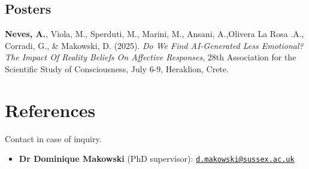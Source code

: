 \documentclass[11pt,a4paper,]{awesome-cv}
\providecommand{\tightlist}{%
	\setlength{\itemsep}{0pt}\setlength{\parskip}{0pt}}
\begin{document}
\normalsize

\subsection{Posters}\label{posters}

\small

\textbf{Neves, A.}, Viola, M., Sperduti, M., Marini, M., Ansani,
A.,Olivera La Rosa .A., Corradi, G., \& Makowski, D. (2025). \emph{Do We
Find AI-Generated Less Emotional? The Impact Of Reality Beliefs On
Affective Responses}, 28th Association for the Scientific Study of
Consciousness, July 6-9, Heraklion, Crete.

\normalsize

\section{References}\label{references}

\small

Contact in case of inquiry.

\begin{itemize}
\tightlist
\item
  \textbf{Dr Dominique Makowski} (PhD supervisor):
  \href{mailto:d.makowski@sussex.ac.uk}{\nolinkurl{d.makowski@sussex.ac.uk}}
\end{itemize}

\normalsize


\label{LastPage}~
\end{document}
